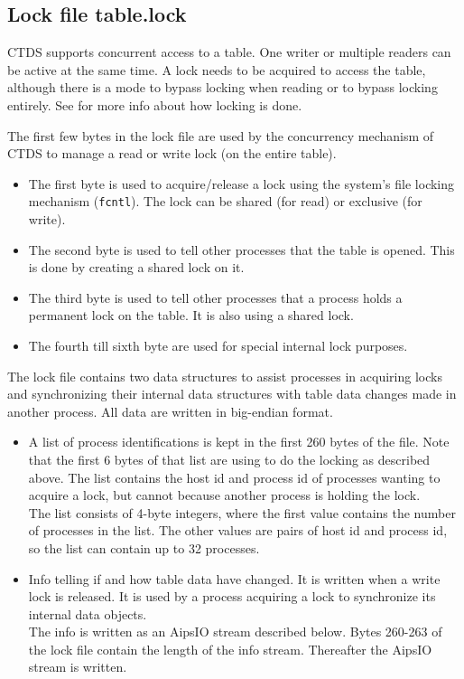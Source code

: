 \subsection{Lock file table.lock}
CTDS supports concurrent access to a table. One writer or multiple
readers can be active at the same time. A lock needs to be acquired to
access the table, although there is a mode to bypass locking when
reading or to bypass locking entirely.
See 
for more info about how locking is done.

The first few bytes in the lock file are used by the concurrency
mechanism of CTDS to manage a read or write lock (on the entire table).
\begin{itemize}
\item The first byte is used to acquire/release a lock using the system's
  file locking mechanism (\texttt{fcntl}). The lock can be shared (for
  read) or exclusive (for write).
\item The second byte is used to tell other processes that the table
  is opened. This is done by creating a shared lock on it.
\item The third byte is used to tell other processes that a process holds
  a permanent lock on the table. It is also using a shared lock.
\item The fourth till sixth byte are used for special internal lock purposes.
\end{itemize}

The lock file contains two data structures to assist processes in
acquiring locks and synchronizing their internal data structures with
table data changes made in another process.
All data are written in big-endian format.
\begin{itemize}
\item A list of process identifications is kept in the first
  260 bytes of the file. Note that the first 6 bytes of that list are
  using to do the locking as described above.
  The list contains the host id and process id of
  processes wanting to acquire a  lock, but cannot because
  another process is holding the lock.
  \\The list consists of 4-byte integers, where the first value contains
  the number of processes in the list. The other values are pairs of
  host id and process id, so the list can contain up  to 32 processes.
\item Info telling if and how table data have changed. It is written
  when a write lock is released. It is used by a process
  acquiring a lock to synchronize its internal data objects.
  \\The info is written as an AipsIO stream described below. Bytes
  260-263 of the lock file contain the length of the info
  stream. Thereafter the AipsIO stream is written. 
\end{itemize}

